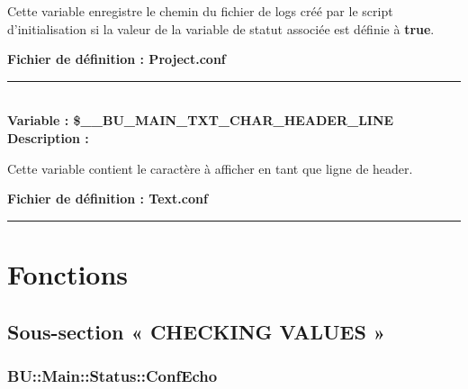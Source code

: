 \documentclass[a4paper,10pt]{article}
\begin{document}
\begin{justify}
    Cette variable enregistre le chemin du fichier de logs créé par le script d'initialisation si la valeur de la variable de statut associée est définie à \textbf{\color{gray}true}.
\end{justify}

\textbf{Fichier de définition : \color{lime}Project.conf} \\[1\baselineskip]



\color{orange}\par\noindent\rule{\textwidth}{0.4pt}\color{white}\\[1\baselineskip]

\textbf{Variable : \color{orange}\$\_\_BU\_MAIN\_TXT\_CHAR\_HEADER\_LINE}\\[1\baselineskip]

\textbf{Description :}

\begin{justify}
    Cette variable contient le caractère à afficher en tant que ligne de header.
\end{justify}

\textbf{Fichier de définition : \color{lime}Text.conf}\\[1\baselineskip]





\color{red}\par\noindent\rule{\textwidth}{0.4pt}\color{white}

\color{red}
\section{Fonctions}\color{white}

\color{green}
\subsection{Sous-section « CHECKING VALUES »}

\color{blue}
\subsubsection{BU::Main::Status::ConfEcho}\color{white}
\end{document}
